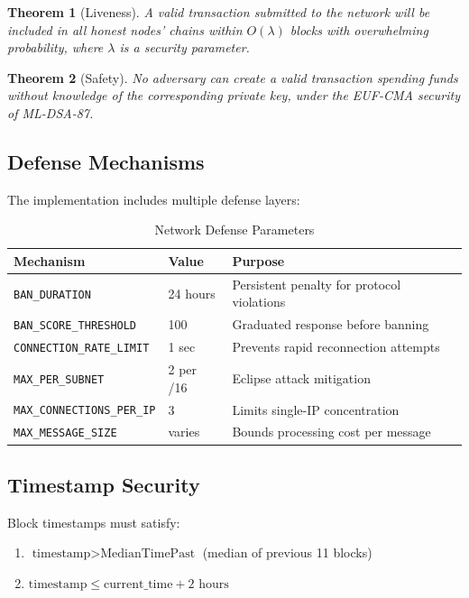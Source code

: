 \documentclass[11pt,a4paper]{article}
\newtheorem{theorem}{Theorem}
\begin{document}
\begin{theorem}[Liveness]
A valid transaction submitted to the network will be included in all honest nodes' chains within $O(\lambda)$ blocks with overwhelming probability, where $\lambda$ is a security parameter.
\end{theorem}

\begin{theorem}[Safety]
No adversary can create a valid transaction spending funds without knowledge of the corresponding private key, under the EUF-CMA security of ML-DSA-87.
\end{theorem}

\subsection{Defense Mechanisms}

The implementation includes multiple defense layers:

\begin{table}[h]
\centering
\caption{Network Defense Parameters}
\begin{tabular}{@{}llp{6cm}@{}}
\toprule
Mechanism & Value & Purpose \\
\midrule
\texttt{BAN\_DURATION} & 24 hours & Persistent penalty for protocol violations \\
\texttt{BAN\_SCORE\_THRESHOLD} & 100 & Graduated response before banning \\
\texttt{CONNECTION\_RATE\_LIMIT} & 1 sec & Prevents rapid reconnection attempts \\
\texttt{MAX\_PER\_SUBNET} & 2 per /16 & Eclipse attack mitigation \\
\texttt{MAX\_CONNECTIONS\_PER\_IP} & 3 & Limits single-IP concentration \\
\texttt{MAX\_MESSAGE\_SIZE} & varies & Bounds processing cost per message \\
\bottomrule
\end{tabular}
\end{table}

\subsection{Timestamp Security}

Block timestamps must satisfy:
\begin{enumerate}
    \item $\text{timestamp} > \text{MedianTimePast}$ (median of previous 11 blocks)
    \item $\text{timestamp} \leq \text{current\_time} + 2 \text{ hours}$
\end{enumerate}
\end{document}
